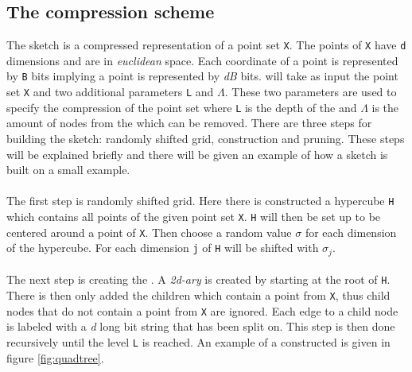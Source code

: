 \subsection{The \qs{} compression scheme}
The sketch is a compressed representation of a point set \texttt{X}. The points of \texttt{X} have \texttt{d} dimensions and are in \textit{euclidean} space. Each coordinate of a point is represented by \texttt{B} bits implying a point is represented by \textit{dB} bits. \qs{} will take as input the point set \texttt{X} and two additional parameters \texttt{L} and $\Lambda$. These two parameters are used to specify the compression of the point set where \texttt{L} is the depth of the \qt{} and $\Lambda$ is the amount of nodes from the \qt{} which can be removed. 
There are three steps for building the sketch: randomly shifted grid, \qt{} construction and pruning. These steps will be explained briefly and there will be given an example of how a sketch is built on a small example.
\\
\\
The first step is randomly shifted grid. Here there is constructed a hypercube \texttt{H} which contains all points of the given point set \texttt{X}. \texttt{H} will then be set up to be centered around a point of \texttt{X}. Then choose a random value $\sigma$ for each dimension of the hypercube. For each dimension \texttt{j} of \texttt{H} will be shifted with $\sigma_j$.
\\
\\
The next step is creating the \qt{}. A \textit{2d-ary} \qt{} is created by starting at the root of \texttt{H}. There is then only added the children which contain a point from \texttt{X}, thus child nodes that do not contain a point from \texttt{X} are ignored. Each edge to a child node is labeled with a \textit{d} long bit string that has been split on. This step is then done recursively until the level \texttt{L} is reached. An example of a constructed \qt{} is given in figure \ref{fig:quadtree}.

